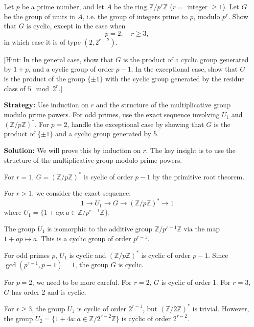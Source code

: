 \begin{problembox}
Let $p$ be a prime number, and let $A$ be the ring $\mathbb{Z}/p^r\mathbb{Z}$ ($r =$ integer $\geq 1$). Let $G$ be the group of units in $A$, i.e. the group of integers prime to $p$, modulo $p^r$. Show that $G$ is cyclic, except in the case when
\[ p = 2, \quad r \geq 3, \]
in which case it is of type $(2, 2^{r-2})$. 

[Hint: In the general case, show that $G$ is the product of a cyclic group generated by $1 + p$, and a cyclic group of order $p - 1$. In the exceptional case, show that $G$ is the product of the group $\{\pm 1\}$ with the cyclic group generated by the residue class of $5 \mod 2^r$.]
\end{problembox}

\noindent\textbf{Strategy:} Use induction on $r$ and the structure of the multiplicative group modulo prime powers. For odd primes, use the exact sequence involving $U_1$ and $(\mathbb{Z}/p\mathbb{Z})^*$. For $p = 2$, handle the exceptional case by showing that $G$ is the product of $\{\pm 1\}$ and a cyclic group generated by 5.

\noindent\textbf{Solution:}
We will prove this by induction on $r$. The key insight is to use the structure of the multiplicative group modulo prime powers.

For $r = 1$, $G = (\mathbb{Z}/p\mathbb{Z})^*$ is cyclic of order $p-1$ by the primitive root theorem.

For $r > 1$, we consider the exact sequence:
\[ 1 \rightarrow U_1 \rightarrow G \rightarrow (\mathbb{Z}/p\mathbb{Z})^* \rightarrow 1 \]
where $U_1 = \{1 + ap : a \in \mathbb{Z}/p^{r-1}\mathbb{Z}\}$.

The group $U_1$ is isomorphic to the additive group $\mathbb{Z}/p^{r-1}\mathbb{Z}$ via the map $1 + ap \mapsto a$. This is a cyclic group of order $p^{r-1}$.

For odd primes $p$, $U_1$ is cyclic and $(\mathbb{Z}/p\mathbb{Z})^*$ is cyclic of order $p-1$. Since $\gcd(p^{r-1}, p-1) = 1$, the group $G$ is cyclic.

For $p = 2$, we need to be more careful. For $r = 2$, $G$ is cyclic of order 1. For $r = 3$, $G$ has order 2 and is cyclic.

For $r \geq 3$, the group $U_1$ is cyclic of order $2^{r-1}$, but $(\mathbb{Z}/2\mathbb{Z})^*$ is trivial. However, the group $U_2 = \{1 + 4a : a \in \mathbb{Z}/2^{r-2}\mathbb{Z}\}$ is cyclic of order $2^{r-2}$.

